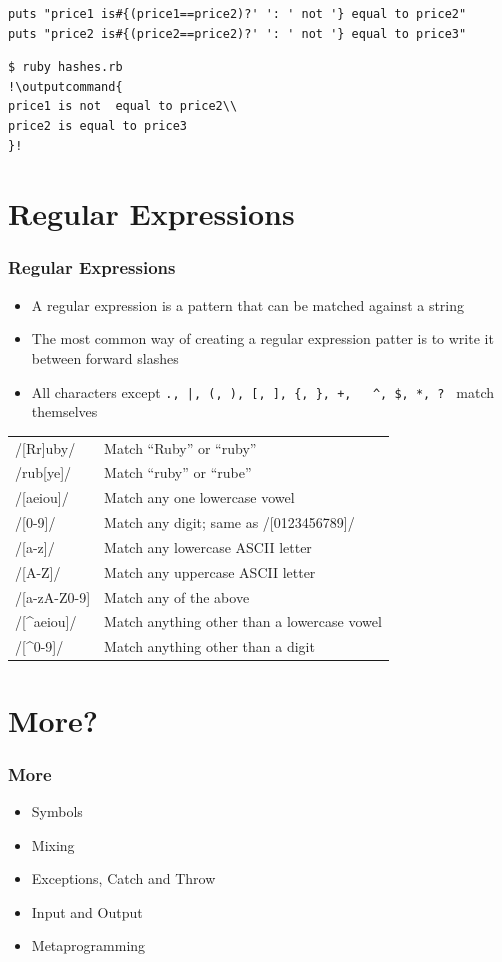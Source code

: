 \documentclass{beamer}
\newcommand{\outputcommand}[1]{\color{darkgreen}{#1}}
\begin{document}
\begin{frame}
\begin{itemize}
\begin{lstlisting}[escapechar=&]
puts "price1 is#{(price1==price2)?' ': ' not '} equal to price2"
puts "price2 is#{(price2==price2)?' ': ' not '} equal to price3"
\end{lstlisting}

\lstset{language=shell}
\begin{lstlisting}[numbers=none, escapechar=!]
$ ruby hashes.rb
!\outputcommand{
price1 is not  equal to price2\\
price2 is equal to price3
}!
\end{lstlisting}
\end{itemize}

\end{frame}
\section{Regular Expressions}
\begin{frame}
\frametitle{Regular Expressions}
\begin{itemize}
 \item A regular expression is a pattern that can be matched against a string
 \item The most common way of creating a regular expression patter is to write it between forward slashes
 \item All characters except \texttt{., |, (, ), [, ], \{, \}, +, \, \^{}, \$, *, ? } match themselves
\end{itemize}
\pagebreak
 \begin{tabular}{ll}
/[Rr]uby/  & Match ``Ruby'' or ``ruby''\\
/rub[ye]/ & Match ``ruby'' or ``rube''\\
/[aeiou]/ & Match any one lowercase vowel\\
/[0-9]/ & Match any digit; same as /[0123456789]/\\
/[a-z]/   & Match any lowercase ASCII letter\\
/[A-Z]/   & Match any uppercase ASCII letter\\
/[a-zA-Z0-9] & Match any of the above\\
/[\^{}aeiou]/  & Match anything other than a lowercase vowel\\
/[\^{}0-9]/ & Match anything other than a digit\\
 \end{tabular} 
\end{frame}
\section{More? }
\begin{frame}[fragile]
\frametitle{More}
\begin{itemize}
 \item Symbols
 \item Mixing
 \item Exceptions, Catch and Throw
 \item Input and Output
 \item Metaprogramming
\end{itemize}
\end{frame}
\end{document}
